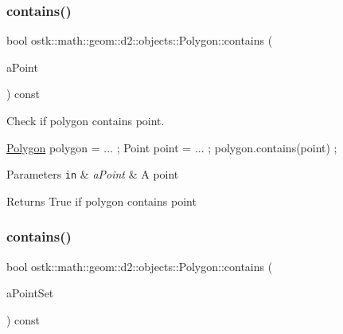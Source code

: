 \subsubsection{\texorpdfstring{contains()}{contains()}\hspace{0.1cm}{\footnotesize\ttfamily [1/2]}}
{\footnotesize\ttfamily bool ostk\+::math\+::geom\+::d2\+::objects\+::\+Polygon\+::contains (\begin{DoxyParamCaption}\item[{const \hyperlink{classostk_1_1math_1_1geom_1_1d2_1_1objects_1_1_point}{Point} \&}]{a\+Point }\end{DoxyParamCaption}) const}



Check if polygon contains point. 


\begin{DoxyCode}
\hyperlink{classostk_1_1math_1_1geom_1_1d2_1_1objects_1_1_polygon_adaf9ef564754ab10ed3dd0d5fa0d90ea}{Polygon} polygon = ... ;
Point point = ... ;
polygon.contains(point) ;
\end{DoxyCode}



\begin{DoxyParams}[1]{Parameters}
\mbox{\tt in}  & {\em a\+Point} & A point \\
\hline
\end{DoxyParams}
\begin{DoxyReturn}{Returns}
True if polygon contains point 
\end{DoxyReturn}
\mbox{\label{classostk_1_1math_1_1geom_1_1d2_1_1objects_1_1_polygon_a6a95f14d1bcbc3d0231ed09f31d17045}} 
\subsubsection{\texorpdfstring{contains()}{contains()}\hspace{0.1cm}{\footnotesize\ttfamily [2/2]}}
{\footnotesize\ttfamily bool ostk\+::math\+::geom\+::d2\+::objects\+::\+Polygon\+::contains (\begin{DoxyParamCaption}\item[{const \hyperlink{classostk_1_1math_1_1geom_1_1d2_1_1objects_1_1_point_set}{Point\+Set} \&}]{a\+Point\+Set }\end{DoxyParamCaption}) const}




